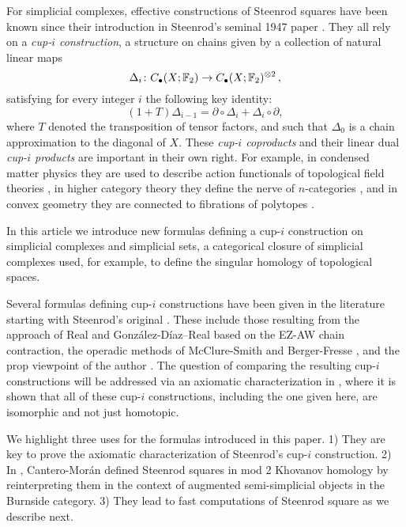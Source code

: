 For simplicial complexes, effective constructions of Steenrod squares have been known since their introduction in Steenrod's seminal 1947 paper \cite{steenrod1947products}.
They all rely on a \textit{cup-$i$ construction}, a structure on chains given by a collection of natural linear maps
\begin{equation*}
\Delta_i \colon C_\bullet(X; {\mathbb{F}_2})  \to C_\bullet(X; {\mathbb{F}_2})^{\otimes 2}\,,
\end{equation*}
satisfying for every integer $i$ the following key identity:
\begin{equation*}
(1+T) \Delta_{i-1} =
\partial \circ \Delta_i + \Delta_i \circ \partial,
\end{equation*}
where $T$ denoted the transposition of tensor factors,
and such that $\Delta_0$ is a chain approximation to the diagonal of $X$.
These \textit{cup-$i$ coproducts} and their linear dual \textit{cup-$i$ products} are important in their own right.
For example, in condensed matter physics they are used to describe action functionals of topological field theories \cite{gaiotto2016spin, kapustin2017fermionic, barkeshli2021classification}, in higher category theory they define the nerve of $n$-categories \cite{medina2020globular}, and in convex geometry they are connected to fibrations of polytopes \cite{kapranov1991polycategory, medina2022fib_poly}.

In this article we introduce new formulas defining a cup-$i$ construction on simplicial complexes and simplicial sets, a categorical closure of simplicial complexes used, for example, to define the singular homology of topological spaces.

Several formulas defining cup-$i$ constructions have been given in the literature starting with Steenrod's original \cite{steenrod1947products}.
These include those resulting from the approach of Real \cite{real1996computability} and Gonz\'alez-D\'iaz--Real \cite{gonzalez-diaz1999steenrod, gonzalez2003computation, gonzalez-diaz2005cocyclic} based on the EZ-AW chain contraction, the operadic methods of McClure-Smith \cite{mcclure2003multivariable} and Berger-Fresse \cite{berger2004combinatorial}, and the prop viewpoint of the author \cite{medina2020prop1, medina2021prop2}.
The question of comparing the resulting cup-$i$ constructions will be addressed via an axiomatic characterization in \cite{medina2022axiomatic}, where it is shown that all of these cup-$i$ constructions, including the one given here, are isomorphic and not just homotopic.

We highlight three uses for the formulas introduced in this paper.
1) They are key to prove the axiomatic characterization of Steenrod's cup-$i$ construction.
2) In \cite{cantero-moran2020khovanov}, Cantero-Mor\'an defined Steenrod squares in mod 2 Khovanov homology \cite{khovanov2000categorification} by reinterpreting them in the context of augmented semi-simplicial objects in the Burnside category.
3) They lead to fast computations of Steenrod square as we describe next.

